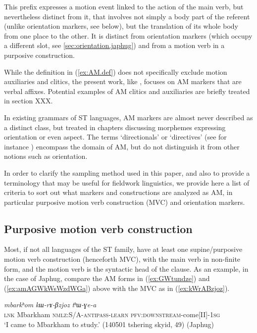 \documentclass[oneside,a4paper,11pt]{article}
\newcommand{\ipa}[1]{{\phon\textit{#1}}}
\begin{document}
This prefix expresses a motion event linked to the action of the main verb, but nevertheless distinct from it, that involves not simply a body part of the referent (unlike orientation markers, see below), but the translation of its whole body from one place to the other. It is distinct from orientation markers (which occupy a different slot, see \ref{sec:orientation.japhug}) and from a motion verb in a purposive construction.

While the definition in (\ref{ex:AM.def}) does not specifically exclude motion auxiliaries and clitics, the present work, like \citet[19-20]{guillaume16am}, focuses on AM markers that are verbal affixes. Potential examples of AM clitics and auxiliaries are briefly treated in section XXX.


In existing grammars of ST languages, AM markers are almost never described as a distinct class, but treated in chapters discussing morphemes expressing orientation or even aspect. The terms `directionals' or `directives' (see for instance \citealt{delancey85analysis}) encompass the domain of AM, but do not distinguish it from other notions such as orientation.

In order to clarify the sampling method used in this paper, and also to provide a terminology that may be useful for fieldwork linguistics, we provide here a list of criteria to sort out what markers and constructions are analyzed as AM, in particular purposive motion verb construction (MVC) and orientation markers.

\subsection{Purposive motion verb construction}
Most, if not all languages of the ST family, have at least one supine/purposive motion verb construction (henceforth MVC), with the main verb in non-finite form, and the motion verb is the syntactic head of the clause. As an example, in the case of Japhug, compare the AM forms in  (\ref{ex:GWtundze})  and (\ref{ex:amAGWkWsWzdWGa}) above with the MVC as in (\ref{ex:kWrABzjoz}). 

\begin{exe}
\ex \label{ex:kWrABzjoz}
 \gll \ipa{tɕe} \ipa{mbarkʰom} \ipa{kɯ-rɤ-βzjoz} \ipa{tʰɯ-ɣe-a} \\
\textsc{lnk} Mbarkham \textsc{nmlz}:S/A-\textsc{antipass}-\textsc{learn} \textsc{pfv}:\textsc{downstream}-come[II]-\textsc{1sg} \\
 \glt `I came to Mbarkham to study.' (140501 tshering skyid, 49) (Japhug)
 \end{exe}
 
\end{document}
